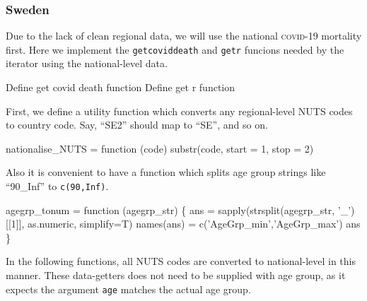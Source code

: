 \documentclass{article}
\begin{document}
\subsubsection{Sweden}
Due to the lack of clean regional data, we will use the national \textsc{covid}-19 mortality first. Here we implement
the {\tt{}get{}covid{}death} and {\tt{}get{}r} funcions needed by the iterator using the national-level data.

\nwenddocs{}\plusendmoddef
\LA{}Define get covid death function\RA{}
\LA{}Define get r function\RA{}
\nwendcode{}\nwdocspar

First, we define a utility function which converts any regional-level NUTS
codes to country code. Say, ``SE2'' should map to ``SE'', and so on.

\nwenddocs{}\plusendmoddef
nationalise_NUTS = function (code)
    substr(code, start = 1, stop = 2)
\nwendcode{}\nwdocspar

Also it is convenient to have a function which splits age group strings like
``90\_Inf'' to {\tt{}c(90,Inf)}.

\nwenddocs{}\plusendmoddef
agegrp_tonum = function (agegrp_str) \{
    ans = sapply(strsplit(agegrp_str, '_')[[1]], as.numeric, simplify=T)
    names(ans) = c('AgeGrp_min','AgeGrp_max')
    ans
\}
\nwendcode{}\nwdocspar

In the following functions, all NUTS codes are converted to national-level
in this manner. These data-getters does not need to be supplied with
age group, as it expects the argument {\tt{}age} matches the actual age group.
\end{document}

